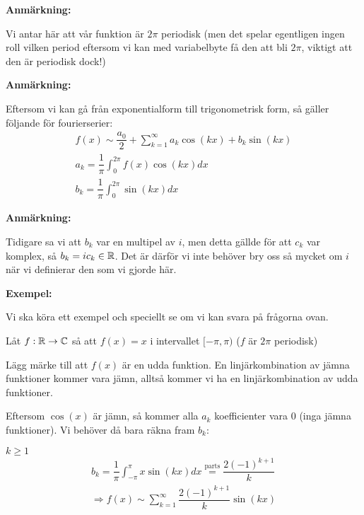 \noindent\textbf{Anmärkning:}\par
\noindent Vi antar här att vår funktion är $2\pi$ periodisk (men det spelar egentligen ingen roll vilken period eftersom vi kan med variabelbyte få den att bli $2\pi$, viktigt att den är periodisk dock!)
\par\bigskip
\noindent\textbf{Anmärkning:}\par
\noindent Eftersom vi kan gå från exponentialform till trigonometrisk form, så gäller följande för fourierserier:
\begin{equation*}
  \begin{gathered}
    f(x)\sim \dfrac{a_0}{2}+\sum_{k=1}^{\infty}a_k\cos(kx)+b_k\sin(kx)\\
    a_k = \dfrac{1}{\pi}\int_{0}^{2\pi}f(x)\cos(kx)dx\\
    b_k = \dfrac{1}{\pi}\int_{0}^{2\pi}\sin(kx)dx
  \end{gathered}
\end{equation*}
\par\bigskip
\noindent\textbf{Anmärkning:}\par
\noindent Tidigare sa vi att $b_k$ var en multipel av $i$, men detta gällde för att $c_k$ var komplex, så $b_k = ic_k\in\mathbb{R}$. Det är därför vi inte behöver bry oss så mycket om $i$ när vi definierar den som vi gjorde här.
\par\bigskip
\noindent\textbf{Exempel:}\par
\noindent Vi ska köra ett exempel och speciellt se om vi kan svara på frågorna ovan.
\par\bigskip
\noindent Låt $f:\mathbb{R}\to\mathbb{C}$ så att $f(x) = x$ i intervallet $[-\pi,\pi)$ ($f$ är $2\pi$ periodisk)
\par\bigskip
\noindent Lägg märke till att $f(x)$ är en udda funktion. En linjärkombination av jämna funktioner kommer vara jämn, alltså kommer vi ha en linjärkombination av udda funktioner.\par
\noindent Eftersom $\cos(x)$ är jämn, så kommer alla $a_k$ koefficienter vara 0 (inga jämna funktioner). Vi behöver då bara räkna fram $b_k$:\par
$k\geq1$
\begin{equation*}
  \begin{gathered}
    b_k = \dfrac{1}{\pi}\int_{-\pi}^{\pi}x\sin(kx)dx \stackrel{\text{parts}}{=} \dfrac{2(-1)^{k+1}}{k}\\
    \Rightarrow f(x)\sim\sum_{k=1}^{\infty}\dfrac{2(-1)^{k+1}}{k}\sin(kx)
  \end{gathered}
\end{equation*}
